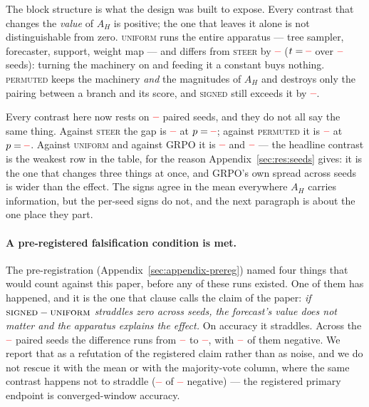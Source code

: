 \documentclass[11pt]{article}
\newcommand{\AH}{A_{H}}
\providecommand{\PENDING}{\textcolor{red}{\textbf{--}}}
\newcommand{\num}[1]{\ifcsname #1\endcsname\csname #1\endcsname\else\PENDING\fi}
\begin{document}
The block structure is what the design was built to expose. Every contrast that
changes the \emph{value} of $\AH$ is positive; the one that leaves it alone is not
distinguishable from zero. \textsc{uniform} runs the entire apparatus --- tree
sampler, forecaster, support, weight map --- and differs from \textsc{steer} by
$\num{Cuniformsteeracc}$ ($t = \num{Tuniformsteeracc}$ over
$\num{Nseedsused}$ seeds): turning the machinery on and feeding it a constant
buys nothing. \textsc{permuted} keeps the machinery \emph{and} the magnitudes of
$\AH$ and destroys only the pairing between a branch and its score, and \textsc{signed}
still exceeds it by $\num{Csignedpermutedacc}$.

Every contrast here now rests on $\num{Nsignedgrpo}$ paired seeds, and they do not
all say the same thing. Against \textsc{steer} the gap is $\num{Csignedsteeracc}$ at
$p = \num{Psignedsteeracc}$; against \textsc{permuted} it is
$\num{Csignedpermutedacc}$ at $p = \num{Psignedpermutedacc}$. Against
\textsc{uniform} and against GRPO it is $\num{Psigneduniformacc}$ and
$\num{Psignedgrpoacc}$ --- the headline contrast is the weakest row in the table, for
the reason Appendix~\ref{sec:res:seeds} gives: it is the one that changes three things
at once, and GRPO's own spread across seeds is wider than the effect. The signs agree
in the mean everywhere $\AH$ carries information, but the per-seed signs do not, and
the next paragraph is about the one place they part.

\paragraph{A pre-registered falsification condition is met.} The pre-registration
(Appendix~\ref{sec:appendix-prereg}) named four things that would count against this
paper, before any of these runs existed. One of them has happened, and it is the one
that clause calls the claim of the paper: \emph{if
$\textsc{signed} - \textsc{uniform}$ straddles zero across seeds, the forecast's value
does not matter and the apparatus explains the effect.} On accuracy it straddles.
Across the $\num{Nsigneduniform}$ paired seeds the difference runs from
$\num{CLosigneduniformacc}$ to $\num{CHisigneduniformacc}$, with
$\num{CNegsigneduniformacc}$ of them negative. We report that as a refutation of the
registered claim rather than as noise, and we do not rescue it with the mean or with
the majority-vote column, where the same contrast happens not to straddle
($\num{CNegsigneduniformmaj}$ of $\num{Nsigneduniform}$ negative) --- the registered
primary endpoint is converged-window accuracy.
\end{document}

